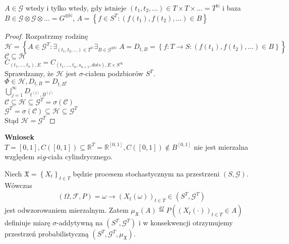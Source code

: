 \begin{twr}
$ A\in\mathcal G $ wtedy i tylko wtedy, gdy istnieje $ \left(t_1,t_2,\dots \right)\in T\times T\times\dots =T^\mathbb N $ i baza $ B\in \mathcal G\otimes\mathcal G\otimes\dots =G^{\otimes \mathbb N }$, $ A=\left\{f\in S^T:\left(f(t_1),f(t_2),\dots \right)\in B\right\} $
\begin{proof}
Rozpatrzmy rodzinę\\
$ \mathcal H=\left\{A\in \mathcal G^T:\exists_{(t_1,t_2,\dots )\in T^\mathbb N }\exists_{B\in \mathcal G^{\otimes \mathbb N }}\;A=D_{\underline t,B}=\left\{f:T\to S:\left(f(t_1),f(t_2),\dots\right)\in B\right\}\right\} $\\
$ \mathcal C\subseteq \mathcal H $\\
$ C_{\left(t_1,\dots,t_n\right),E}=C_{\left(t_1,\dots,t_n,s_{n+1},dots\right),E\times S^\infty } $\\
Sprawdzamy, że $ \mathcal H $ jest $ \sigma $-ciałem podzbiorów $ S^T $.\\
$ \Phi\in\mathcal H,D_{\underline t,B}=D_{\underline t,B^\mathrm c} $\\
$ \bigcup_{j=1}^\infty D_{\underline t^{(j)},B^{(j)}}$\\
$ \mathcal C\subseteq \mathcal H\subseteq \mathcal G^T=\sigma(\mathcal C) $\\
$ \mathcal G^T=\sigma(\mathcal C)\subseteq \mathcal H\subseteq \mathcal G^T $\\
Stąd $ \mathcal H=\mathcal G^T $
\end{proof}
\end{twr}
\textbf{Wniosek}\\
$ T=[0,1],C\left([0,1]\right)\subseteq \mathbb R ^T=\mathbb R ^{[0,1]},C\left([0,1]\right)\notin B^{[0,1]} $ nie jest mierzalna względem $ sig
$-ciała cylindrycznego.
\begin{twr}
Niech $ \mathfrak X=\left\{X_t\right\} _{t\in T}$ będzie procesem stochastycznym na przestrzeni $ \left(S,\mathcal G\right) $. Wówczas
\begin{gather*}
\left(\Omega,\mathcal F,P\right)=\omega\longrightarrow \left(X_t(\omega)\right)_{t\in T}\in \left(S^T,\mathcal G^T\right)
\end{gather*}
jest odwzorowaniem mierzalnym. Zatem $ \mu_\mathfrak X(A)\stackrel{df}{=}P\left(\left(X_t(\cdot )\right)_{t\in T}\in A\right) $ definiuje miarę $ \sigma $-addytywną na $ \left(S^T,\mathcal G^T\right) $ i w konsekwencji otrzymujemy przestrzeń probabilistyczną $ \left(S^T,\mathcal G^T,\mu_\mathfrak X\right) $.
\end{twr}
